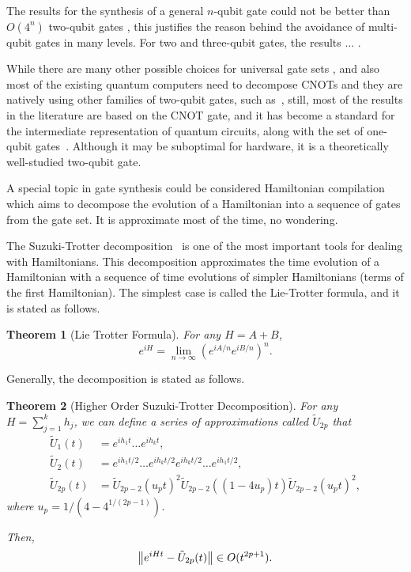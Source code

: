 \documentclass{report}
\newtheorem{theorem}{Theorem}
\begin{document}
The results for the synthesis of a general $n$-qubit gate could not be better than $O(4^n)$ two-qubit gates \cite{TODO}, this justifies the reason behind the avoidance of multi-qubit gates in many levels. For two and three-qubit gates, the results ... \cite{TODO}.

While there are many other possible choices for universal gate sets \cite{TODO}, and also most of the existing quantum computers need to decompose CNOTs and they are natively using other families of two-qubit gates, such as~\cite{foxen2020}, still, most of the results in the literature are based on the CNOT gate, and it has become a standard for the intermediate representation of quantum circuits, along with the set of one-qubit gates~\cite{zulehner2018,siraichi2018,li2019,zhang2021,zhou2020,itoko2019,murali2019,sivarajah2021}. Although it may be suboptimal for hardware, it is a theoretically well-studied two-qubit gate.

A special topic in gate synthesis could be considered Hamiltonian compilation which aims to decompose the evolution of a Hamiltonian into a sequence of gates from the gate set. It is approximate most of the time, no wondering.



The Suzuki-Trotter decomposition~\cite{trotter1959, suzuki1991} is one of the most important tools for dealing with Hamiltonians. This decomposition approximates the time evolution of a Hamiltonian with a sequence of time evolutions of simpler Hamiltonians (terms of the first Hamiltonian). The simplest case is called the Lie-Trotter formula, and it is stated as follows.

\begin{theorem}[Lie Trotter Formula]
For any $H = A + B$,
\begin{equation}
  e^{iH} = \lim_{n \to \infty} (e^{iA/n} e^{iB/n})^n.
\end{equation}
\end{theorem}

Generally, the decomposition is stated as follows.
\begin{theorem}[Higher Order Suzuki-Trotter Decomposition]
  For any $H = \sum_{j=1}^k h_j$, we can define a series of approximations called $\tilde{U}_{2p}$ that
  \begin{align}
\tilde{U}_1(t) &= e^{i h_1 t}\dots e^{i h_k t}, \\
\tilde{U}_2(t) &= e^{i h_1 t / 2}\dots e^{i h_k t / 2} e^{i h_k t / 2}\dots e^{i h_1 t / 2}, \\
\tilde{U}_{2p}(t) &= \tilde{U}_{2p - 2}(u_p t)^2 \tilde{U}_{2p- 2}((1 - 4u_p) t) \tilde{U}_{2p - 2}(u_p t)^2,
  \end{align}
  where $u_p = 1/(4 - 4^{1/(2p - 1)})$.

  Then, 
  \begin{equation}
    \norm{e^{iHt} - \tilde{U}_{2p}(t)} \in O(t^{2p + 1}).
  \end{equation}
\end{theorem}
\end{document}
